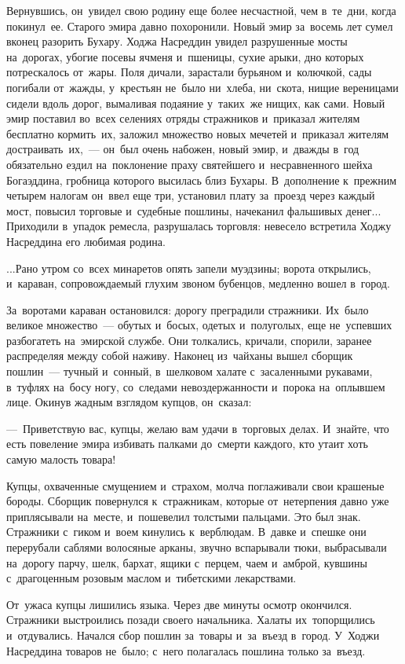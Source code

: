 \documentclass[12pt,a4paper]{book}
\begin{document}
Вернувшись, он~увидел свою родину еще более несчастной, чем в~те~дни, когда покинул~ее. Старого эмира давно похоронили. Новый эмир за~восемь лет сумел вконец разорить Бухару. Ходжа Насреддин увидел разрушенные мосты на~дорогах, убогие посевы ячменя и~пшеницы, сухие арыки, дно которых потрескалось от~жары. Поля дичали, зарастали бурьяном и~колючкой, сады погибали от~жажды, у~крестьян не~было ни~хлеба, ни~скота, нищие вереницами сидели вдоль дорог, вымаливая подаяние у~таких~же нищих, как сами. Новый эмир поставил во~всех селениях отряды стражников и~приказал жителям бесплатно кормить~их, заложил множество новых мечетей и~приказал жителям достраивать~их,~— он~был очень набожен, новый эмир, и~дважды в~год обязательно ездил на~поклонение праху святейшего и~несравненного шейха Богаэддина, гробница которого высилась близ Бухары. В~дополнение к~прежним четырем налогам он~ввел еще три, установил плату за~проезд через каждый мост, повысил торговые и~судебные пошлины, начеканил фальшивых денег... Приходили в~упадок ремесла, разрушалась торговля: невесело встретила Ходжу Насреддина его любимая родина.

...Рано утром со~всех минаретов опять запели муэдзины; ворота открылись, и~караван, сопровождаемый глухим звоном бубенцов, медленно вошел в~город.

За~воротами караван остановился: дорогу преградили стражники. Их~было великое множество~— обутых и~босых, одетых и~полуголых, еще не~успевших разбогатеть на~эмирской службе. Они толкались, кричали, спорили, заранее распределяя между собой наживу. Наконец из~чайханы вышел сборщик пошлин~— тучный и~сонный, в~шелковом халате с~засаленными рукавами, в~туфлях на~босу ногу, со~следами невоздержанности и~порока на~оплывшем лице. Окинув жадным взглядом купцов, он~сказал:

—~Приветствую вас, купцы, желаю вам удачи в~торговых делах. И~знайте, что есть повеление эмира избивать палками до~смерти каждого, кто утаит хоть самую малость товара!

Купцы, охваченные смущением и~страхом, молча поглаживали свои крашеные бороды. Сборщик повернулся к~стражникам, которые от~нетерпения давно уже приплясывали на~месте, и~пошевелил толстыми пальцами. Это был знак. Стражники с~гиком и~воем кинулись к~верблюдам. В~давке и~спешке они перерубали саблями волосяные арканы, звучно вспарывали тюки, выбрасывали на~дорогу парчу, шелк, бархат, ящики с~перцем, чаем и~амброй, кувшины с~драгоценным розовым маслом и~тибетскими лекарствами.

От~ужаса купцы лишились языка. Через две минуты осмотр окончился. Стражники выстроились позади своего начальника. Халаты их~топорщились и~отдувались. Начался сбор пошлин за~товары и~за~въезд в~город. У~Ходжи Насреддина товаров не~было; с~него полагалась пошлина только за~въезд.
\end{document}
